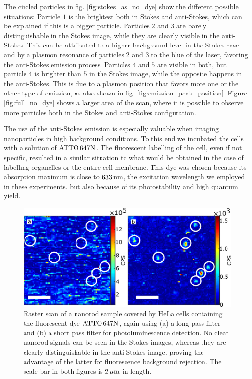 The circled particles in fig. \ref{fig:stokes_as_no_dye} show the different
possible situations: Particle $1$ is the brightest both in Stokes and
anti-Stokes, which can be explained if this is a bigger particle.
Particles $2$ and $3$ are barely distinguishable in the Stokes image, while they
are clearly visible in the anti-Stokes. This can be attributed to a higher
background level in the Stokes case and by a plasmon resonance of particles $2$
and $3$ to the blue of the laser, favoring the anti-Stokes emission process.
Particles $4$ and $5$ are visible in both, but particle $4$ is brighter than $5$
in the Stokes image, while the opposite happens in the anti-Stokes.
This is due to a plasmon position that favors more one or the other type of
emission, as also shown in fig. \ref{fig:emission_peak_position}. Figure
\ref{fig:full_no_dye} shows a larger area of the scan, where it is possible to
observe more particles both in the Stokes and anti-Stokes configuration.

The use of the anti-Stokes emission is especially valuable when imaging
nanoparticles in high background conditions. To this end we incubated the cells
with a solution of $\textrm{ATTO}\,647\textrm{N}$. The fluorescent labelling of the cell, even if not
specific, resulted in a similar situation to what would be obtained in the case
of labelling organelles or the entire cell membrane. This dye was chosen because
its absorption maximum is close to $633\,\textrm{nm}$, the excitation wavelength we
employed in these experiments, but also because of its photostability and high
quantum yield.

\begin{figure}[tp] \centering
\includegraphics[width=12cm]{Chapters/03_Background_Free/Figures/05_Stokes_AS_with_dye/stokes_as_with_dye.png}
\caption{Raster scan of a nanorod sample covered by HeLa cells containing the
fluorescent dye $\textrm{ATTO}\,647\textrm{N}$, again using (a) a long pass filter and (b) a short pass
filter for photoluminescence detection. No clear nanorod signals can be seen in
the Stokes images, whereas they are clearly distinguishable in the anti-Stokes
image, proving the advantage of the latter for fluorescence background
rejection. The scale bar in both figures is $2\,\mu\textrm{m}$ in length.}
	\label{fig:Stokes_AS_with_dye}
\end{figure}

